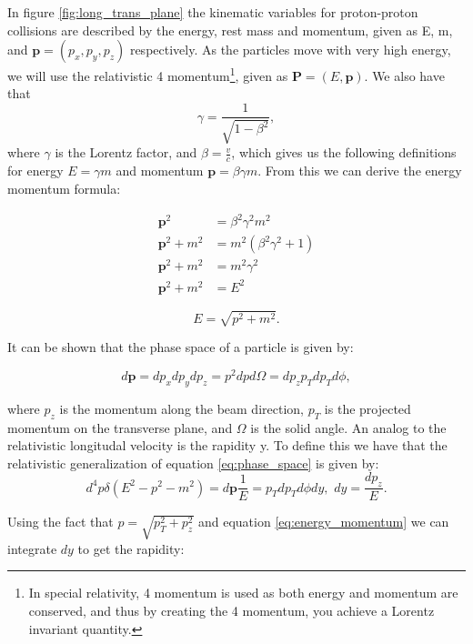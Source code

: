 In figure \ref{fig:long_trans_plane} the kinematic variables for proton-proton collisions are described by the energy, rest mass 
and momentum, given as E, m, and $\textbf{p} = (p_x, p_y, p_z)$ respectively. As the particles move with very high energy, we will 
use the relativistic 4 momentum\footnote{In special relativity, 4 momentum is used as both energy and momentum are conserved, and 
thus by creating the 4 momentum, you achieve a Lorentz invariant quantity\cite{Thomson:2013zua}. }, given as $\textbf{P} = (E, \textbf{p})$. We also have that 
\begin{equation*}
    \gamma = \frac{1}{\sqrt{1-\beta^2}},
\end{equation*}
where $\gamma$ is the Lorentz factor, and $\beta = \frac{v}{c}$, which gives us the following definitions for energy $E = \gamma m$ and momentum $\textbf{p} = \beta\gamma m$\cite{Gramstad:1631043}. 
From this we can derive the energy momentum formula:

\begin{align*} 
    \textbf{p}^2 &= \beta^2\gamma^2m^2  \\ 
    \textbf{p}^2 + m^2 &=  m^2(\beta^2\gamma^2 + 1) \\
    \textbf{p}^2 + m^2 &= m^2\gamma^2 \\
    \textbf{p}^2 + m^2 &= E^2
\end{align*}

\begin{equation}\label{eq:energy_momentum}
    E = \sqrt{p^2 + m^2}.
\end{equation}

It can be shown that the phase space of a particle is given by\cite{green_highpt}:

\begin{equation}\label{eq:phase_space}
    d\textbf{p} = dp_xdp_ydp_z = p^2dpd\Omega = dp_zp_Tdp_Td\phi,
\end{equation}

where $p_z$ is the momentum along the beam direction, $p_T$ is the projected momentum on the transverse plane, 
and $\Omega$ is the solid angle. An analog to the relativistic longitudal velocity is the rapidity y. To define this 
we have that the relativistic generalization of equation \ref{eq:phase_space} is given by:
\begin{equation*}
    d^4p\delta (E^2 - p^2 - m^2) = d\textbf{p}\frac{1}{E} = p_T dp_Td\phi dy, \, \, dy = \frac{dp_z}{E}.
\end{equation*}

Using the fact that $p = \sqrt{p_T^2 + p_z^2}$ and equation \ref{eq:energy_momentum} we can integrate $dy$ to get the rapidity:

